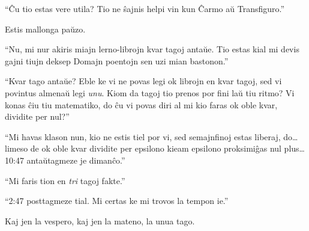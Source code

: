 ``Ĉu tio estas vere utila? Tio ne ŝajnis helpi vin kun Ĉarmo aŭ Transfiguro.''

Estis mallonga paŭzo.

``Nu, mi nur akiris miajn lerno-librojn kvar tagoj antaŭe. Tio estas
kial mi devis gajni tiujn deksep Domajn poentojn sen uzi mian
bastonon.''

``Kvar tago antaŭe? Eble ke vi ne povas legi ok librojn en kvar tagoj,
sed vi povintus almenaŭ legi \emph{unu}. Kiom da tagoj tio prenos por
fini laŭ tiu ritmo? Vi konas ĉiu tiu matematiko, do ĉu vi povas diri
al mi kio faras ok oble kvar, dividite per nul?''

``Mi havas klason nun, kio ne estis tiel por vi, sed semajnfinoj estas
liberaj, do\ldots limeso de ok oble kvar dividite per epsilono kieam
epsilono proksimiĝas nul plus\ldots 10:47 antaŭtagmeze je dimanĉo.''

``Mi faris tion en \emph{tri} tagoj fakte.''

``2:47 posttagmeze tial. Mi certas ke mi trovos la tempon ie.''

Kaj jen la vespero, kaj jen la mateno, la unua tago.





